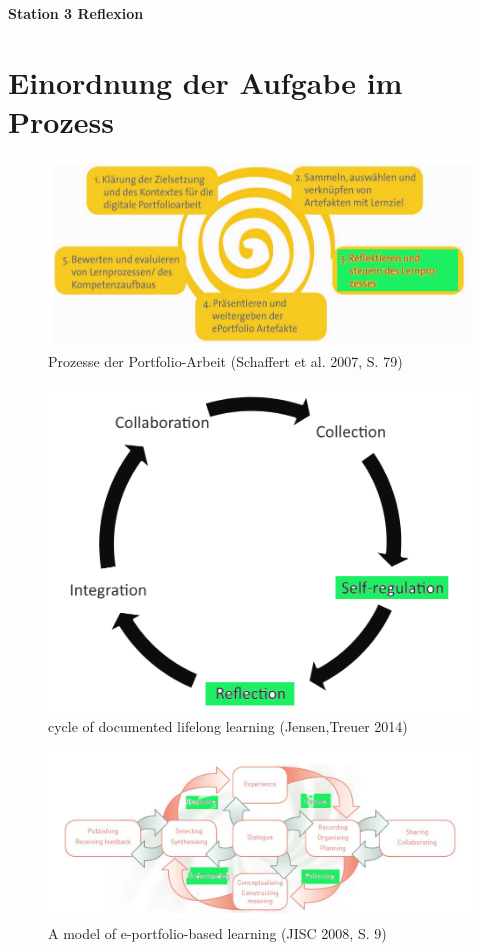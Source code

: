 \documentclass[a4paper,oneside]{scrarticle}
\begin{document}
	\pagestyle{fancy}
	\fancyhead{} %
	\fancyfoot{} %
	\begin{center}
		\begin{LARGE}
			\textbf{Station 3 Reflexion}
		\end{LARGE}
	\end{center}
	
	\section*{Einordnung der Aufgabe im Prozess}
	\begin{figure} [h]
		\centering
		\includegraphics[width=0.7\linewidth]{e-portfolio-prozesse-schaffert}
		\caption{Prozesse der Portfolio-Arbeit (Schaffert et al. 2007, S. 79)\cite{schaffert_e-portfolio-einsatz_2007}}
		\label{fig:e-portfolio-prozesse-schaffert}
	\end{figure}
	\begin{figure}[h]
		\centering
		\includegraphics[width=0.5\linewidth]{cycle-of-documented-lifelong-learning-Jensen}
		\caption{cycle of documented lifelong learning (Jensen,Treuer 2014)\cite{jenson_defining_2014}}
		\label{fig:cycle-of-documented-lifelong-learning-jensen}
	\end{figure}
	\begin{figure}[h]
		\centering
		\includegraphics[width=0.8\linewidth]{model-of-e-portfolio-based-learning}
		\caption{A model of e-portfolio-based learning (JISC 2008, S. 9) \cite{jisc_effective_2008}}
		\label{fig:model-of-e-portfolio-based-learning}
	\end{figure}
	
\end{document}
